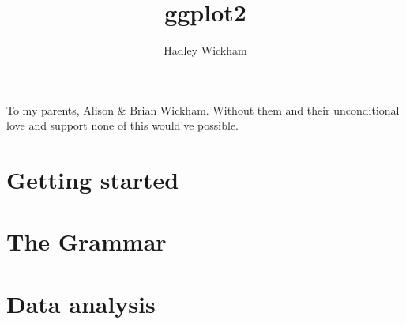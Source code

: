 \documentclass[graybox,envcountchap,sectrefs]{svmono}
\title{ggplot2}
\author{Hadley Wickham}
\begin{document}
\frontmatter
\maketitle

\begin{dedication}
To my parents, Alison \& Brian Wickham. Without them and their unconditional
love and support none of this would've possible.
\end{dedication}



\tableofcontents

\mainmatter

\part{Getting started}





\part{The Grammar}







\part{Data analysis}






\backmatter

\cleardoublepage
{}
\printindex

\printindex[code]
\end{document}
